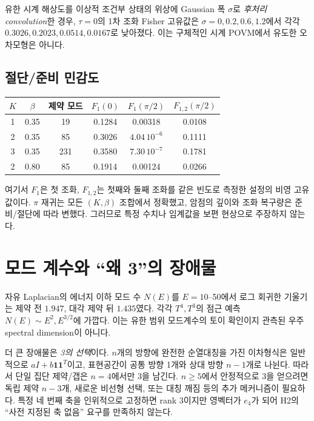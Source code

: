 \documentclass[11pt,a4paper]{article}
\begin{document}
유한 시계 해상도를 이상적 조건부 상태의 위상에 Gaussian 폭 $\sigma$로
\emph{후처리 convolution}한 경우, $\tau=0$의 1차 조화 Fisher 고유값은
$\sigma=0,0.2,0.6,1.2$에서 각각 $0.3026,0.2023,0.0514,0.0167$로
낮아졌다. 이는 구체적인 시계 POVM에서 유도한 오차모형은 아니다.

\subsection{절단/준비 민감도}
\begin{center}
\begin{tabular}{@{}cccccc@{}}
\toprule
$K$ & $\beta$ & 제약 모드 & $F_1(0)$ & $F_1(\pi/2)$ & $F_{1,2}(\pi/2)$\\
\midrule
1 & 0.35 & 19  & 0.1284 & 0.00318 & 0.0108\\
2 & 0.35 & 85  & 0.3026 & $4.04\,10^{-6}$ & 0.1111\\
3 & 0.35 & 231 & 0.3580 & $7.30\,10^{-7}$ & 0.1781\\
2 & 0.80 & 85  & 0.1914 & 0.00124 & 0.0266\\
\bottomrule
\end{tabular}
\end{center}
여기서 $F_1$은 첫 조화, $F_{1,2}$는 첫째와 둘째 조화를
같은 빈도로 측정한 설정의 비영 고유값이다. $\pi$ 재귀는 모든
$(K,\beta)$ 조합에서 정확했고, 암점의 깊이와 조화 복구량은
준비/절단에 따라 변했다. 그러므로 특정 수치나 임계값을
보편 현상으로 주장하지 않는다.

\section{모드 계수와 ``왜 3''의 장애물}
자유 Laplacian의 에너지 이하 모드 수 $N(E)$를 $E=10$--50에서
로그 회귀한 기울기는 제약 전 $1.947$, 대각 제약 뒤 $1.435$였다.
각각 $T^4,T^3$의 점근 예측 $N(E)\sim E^{2},E^{3/2}$에 가깝다.
이는 유한 범위 모드계수의 토이 확인이지 관측된 우주 spectral
dimension이 아니다.

더 큰 장애물은 \emph{3의 선택}이다. $n$개의 방향에 완전한
순열대칭을 가진 이차형식은 일반적으로 $aI+b\mathbf1\mathbf1^T$이고,
표현공간이 공통 방향 1개와 상대 방향 $n-1$개로 나뉜다.
따라서 단일 집단 제약/갭은 $n=4$에서만 3을 남긴다.
$n\ge5$에서 안정적으로 3을 얻으려면 독립 제약 $n-3$개,
새로운 비선형 선택, 또는 대칭 깨짐 등의 추가 메커니즘이 필요하다.
특정 네 번째 축을 인위적으로 고정하면 rank 3이지만 영벡터가
$e_4$가 되어 H2의 ``사전 지정된 축 없음'' 요구를 만족하지 않는다.
\end{document}
